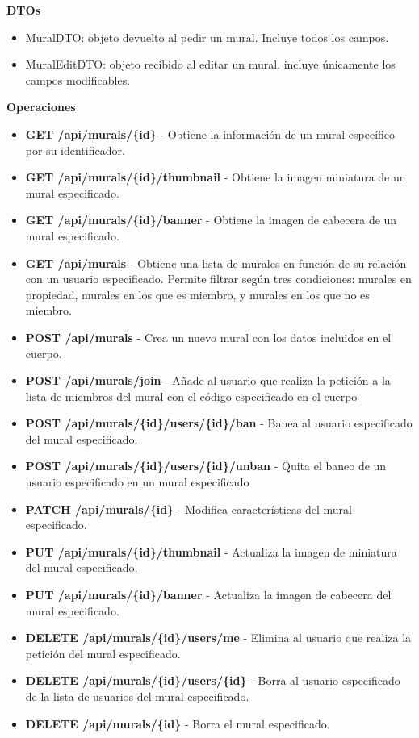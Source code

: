\textbf{DTOs}
\begin{itemize}
    \item MuralDTO: objeto devuelto al pedir un mural. Incluye todos los campos.
    \item MuralEditDTO: objeto recibido al editar un mural, incluye únicamente los campos modificables.
\end{itemize}

\textbf{Operaciones}
\begin{itemize}
    \item \textbf{GET /api/murals/\{id\}} - Obtiene la información de un mural específico por su identificador.
    \item \textbf{GET /api/murals/\{id\}/thumbnail} - Obtiene la imagen miniatura de un mural especificado.
    \item \textbf{GET /api/murals/\{id\}/banner} - Obtiene la imagen de cabecera de un mural especificado.
    \item \textbf{GET /api/murals} - Obtiene una lista de murales en función de su relación con un usuario especificado. Permite filtrar según tres condiciones: murales en propiedad, murales en los que es miembro, y murales en los que no es miembro.
    \item \textbf{POST /api/murals} - Crea un nuevo mural con los datos incluidos en el cuerpo.
    \item \textbf{POST /api/murals/join} - Añade al usuario que realiza la petición a la lista de miembros del mural con el código especificado en el cuerpo
    \item \textbf{POST /api/murals/\{id\}/users/\{id\}/ban} - Banea al usuario especificado del mural especificado. 
    \item \textbf{POST /api/murals/\{id\}/users/\{id\}/unban} - Quita el baneo de un usuario especificado en un mural especificado
    \item \textbf{PATCH /api/murals/\{id\}} - Modifica características del mural especificado.
    \item \textbf{PUT /api/murals/\{id\}/thumbnail} - Actualiza la imagen de miniatura del mural especificado.
    \item \textbf{PUT /api/murals/\{id\}/banner} - Actualiza la imagen de cabecera del mural especificado.
    \item \textbf{DELETE /api/murals/\{id\}/users/me} - Elimina al usuario que realiza la petición del mural especificado.
    \item \textbf{DELETE /api/murals/\{id\}/users/\{id\}} - Borra al usuario especificado de la lista de usuarios del mural especificado.
    \item \textbf{DELETE /api/murals/\{id\}} - Borra el mural especificado.
\end{itemize}